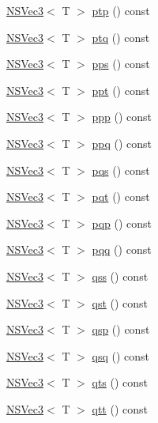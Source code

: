 \begin{DoxyCompactItemize}
\item 
\hyperlink{structNSVec3}{N\-S\-Vec3}$<$ T $>$ \hyperlink{structNSVec4_a61bcf445b0f4930066a4b67e1ac39d02}{ptp} () const 
\item 
\hyperlink{structNSVec3}{N\-S\-Vec3}$<$ T $>$ \hyperlink{structNSVec4_a2ce69c65c37f799ca81f5eb1df4b8057}{ptq} () const 
\item 
\hyperlink{structNSVec3}{N\-S\-Vec3}$<$ T $>$ \hyperlink{structNSVec4_a197fefd4f25707de05a9b08a704dd5c9}{pps} () const 
\item 
\hyperlink{structNSVec3}{N\-S\-Vec3}$<$ T $>$ \hyperlink{structNSVec4_a428e6659af75fa835dfab4dc47ab74be}{ppt} () const 
\item 
\hyperlink{structNSVec3}{N\-S\-Vec3}$<$ T $>$ \hyperlink{structNSVec4_ae5d6a736ca09c02e2b3a3f96d025d773}{ppp} () const 
\item 
\hyperlink{structNSVec3}{N\-S\-Vec3}$<$ T $>$ \hyperlink{structNSVec4_a5f8c41f40fba6a129de57c71b98e0516}{ppq} () const 
\item 
\hyperlink{structNSVec3}{N\-S\-Vec3}$<$ T $>$ \hyperlink{structNSVec4_a268a308c55fa996c292ac6931f98f09c}{pqs} () const 
\item 
\hyperlink{structNSVec3}{N\-S\-Vec3}$<$ T $>$ \hyperlink{structNSVec4_a7fa90e71b60408517fa0bc418d279f3e}{pqt} () const 
\item 
\hyperlink{structNSVec3}{N\-S\-Vec3}$<$ T $>$ \hyperlink{structNSVec4_aed7c0d11048af5a880a3ade40682a149}{pqp} () const 
\item 
\hyperlink{structNSVec3}{N\-S\-Vec3}$<$ T $>$ \hyperlink{structNSVec4_ad63ef42b093de3a42d3864c4f845ee42}{pqq} () const 
\item 
\hyperlink{structNSVec3}{N\-S\-Vec3}$<$ T $>$ \hyperlink{structNSVec4_aa96707aa6115fdc437071ca4f14e0b16}{qss} () const 
\item 
\hyperlink{structNSVec3}{N\-S\-Vec3}$<$ T $>$ \hyperlink{structNSVec4_a0b25de62be62877fcbddba736a981183}{qst} () const 
\item 
\hyperlink{structNSVec3}{N\-S\-Vec3}$<$ T $>$ \hyperlink{structNSVec4_a77a6d2c0872cbf4673d804c901122f46}{qsp} () const 
\item 
\hyperlink{structNSVec3}{N\-S\-Vec3}$<$ T $>$ \hyperlink{structNSVec4_a1e237cf85c109f450242709944fd4317}{qsq} () const 
\item 
\hyperlink{structNSVec3}{N\-S\-Vec3}$<$ T $>$ \hyperlink{structNSVec4_a803831cb2dfc0d1f0b689b624deea9e6}{qts} () const 
\item 
\hyperlink{structNSVec3}{N\-S\-Vec3}$<$ T $>$ \hyperlink{structNSVec4_ae5c3026a7eadb7e1bec9ddd3c8a45bba}{qtt} () const 

\end{DoxyCompactItemize}
